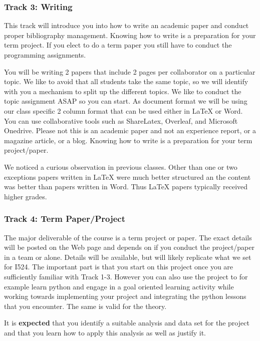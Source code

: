 \subsubsection{Track 3: Writing}

This track will introduce you into how to write an academic paper and
conduct proper bibliography management. Knowing how to write is a
preparation for your term project. If you elect to do a term paper you
still have to conduct the programming assignments.

You will be writing 2 papers that include 2 pages per collaborator on a
particular topic. We like to avoid that all students take the same
topic, so we will identify with you a mechanism to split up the
different topics. We like to conduct the topic assignment ASAP so you
can start. As document format we will be using our class specific 2
column format that can be used either in LaTeX or Word. You can use
collaborative tools such as ShareLatex, Overleaf, and Microsoft
Onedrive. Please not this is an academic paper and not an experience
report, or a magazine article, or a blog. Knowing how to write is a
preparation for your term project/paper.

We noticed a curious observation in previous classes. Other
than one or two exceptions papers written in LaTeX were much better
structured an the content was better than papers written in Word. Thus
LaTeX papers typically received higher grades.

\subsubsection{Track 4: Term Paper/Project}

The major deliverable of the course is a term project or paper. The
exact details will be posted on the Web page and depends on if you
conduct the project/paper in a team or alone. Details will be available,
but will likely replicate what we set for I524. The important part is
that you start on this project once you are sufficiently familiar with
Track 1-3. However you can also use the project to for example learn
python and engage in a goal oriented learning activity while working
towards implementing your project and integrating the python lessons
that you encounter. The same is valid for the theory.

It is \textbf{expected} that you identify a suitable analysis and data
set for the project and that you learn how to apply this analysis as
well as justify it.

